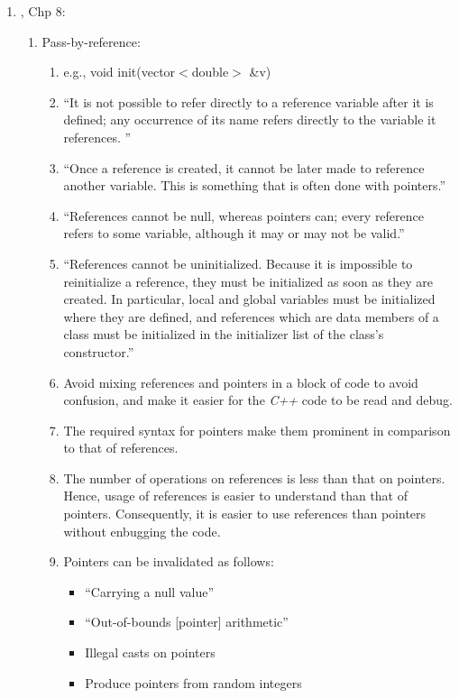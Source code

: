 \begin{enumerate}
\begin{enumerate}
	\item \cite{Stroustrup2014}, Chp 8: \vspace{-0.2cm}
		\begin{enumerate} \itemsep -2pt
		\item Pass-by-reference: \vspace{-0.1cm}
			\begin{enumerate} \itemsep -1pt
			\item e.g., void init(vector$<$double$>$ \&v)
			\item ``It is not possible to refer directly to a reference variable after it is defined; any occurrence of its name refers directly to the variable it references. ''
			\item ``Once a reference is created, it cannot be later made to reference another variable. This is something that is often done with pointers.''
			\item ``References cannot be null, whereas pointers can; every reference refers to some variable, although it may or may not be valid.''
			\item ``References cannot be uninitialized. Because it is impossible to reinitialize a reference, they must be initialized as soon as they are created. In particular, local and global variables must be initialized where they are defined, and references which are data members of a class must be initialized in the initializer list of the class's constructor.''
			\item Avoid mixing references and pointers in a block of code to avoid confusion, and make it easier for the {\it C++} code to be read and debug.
			\item The required syntax for pointers make them prominent in comparison to that of references.
			\item The number of operations on references is less than that on pointers. Hence, usage of references is easier to understand than that of pointers. Consequently, it is easier to use references than pointers without enbugging the code.
			\item Pointers can be invalidated as follows: \vspace{-0.1cm}
				\begin{itemize} \itemsep -1pt
				\item ``Carrying a null value''
				\item ``Out-of-bounds [pointer] arithmetic''
				\item Illegal casts on pointers
				\item Produce pointers from random integers

\end{itemize}
\end{enumerate}
\end{enumerate}
\end{enumerate}
\end{enumerate}
